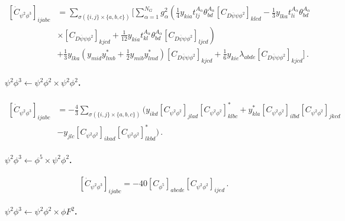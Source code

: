 \begin{align}
    \left[\dot C_{\psi^2\phi^3}\right]_{ijabc} &= \sum_{\sigma(\{i,j\}\times\{a,b,c\})}  \Bigg[\sum_{\alpha=1}^{N_G} g_\alpha^2 \left(\frac{1}{4} y_{kia} t_{lj}^{A_\alpha} \theta_{bd}^{A_\alpha} \left[C_{D\overline\psi\psi\phi^2}\right]_{klcd}-\frac{1}{3} y_{lka}t_{li}^{A_\alpha} \theta_{bd}^{A_\alpha} \right.\nonumber\\
    &\left.\times\left[C_{D\overline\psi\psi\phi^2}\right]_{kjcd}+ \frac{1}{12} y_{kia}t_{kl}^{A_\alpha} \theta_{bd}^{A_\alpha} \left[C_{D\overline\psi\psi\phi^2}\right]_{ljcd}\right) \\
    &+ \frac{1}{3} y_{lka}^{\phantom *} \left( y_{mid}^{\phantom *} y_{lmb}^* +\frac{1}{2}y_{mib}^{\phantom *} y_{lmd}^* \right)  \left[C_{D\overline\psi\psi\phi^2}\right]_{kjcd} +\frac{1}{6} y_{kie} \lambda_{abde} \left[C_{D\overline\psi\psi\phi^2}\right]_{kjcd}\Bigg]\,.\nonumber
\end{align}

\paragraph{\texorpdfstring{$\psi^2 \phi^3 \leftarrow \psi^2\phi^2\times\psi^2\phi^2$}{psi2phi3frompsi2phi2xpsi2phi2}.}

\begin{align}
    \left[\dot C_{\psi^2\phi^3}\right]_{ijabc} &= -\frac{4}{3} \sum_{\sigma(\{i,j\}\times\{a,b,c\})}
    \bigg(
    y_{ikd} \left[C_{\psi^2\phi^2}\right]_{jlad} \left[C_{\psi^2\phi^2}\right]_{klbc}^* + y_{kla}^* \left[C_{\psi^2\phi^2}\right]_{ilbd} \left[C_{\psi^2\phi^2}\right]_{jkcd}\nonumber \\
    &- 
    y_{jlc} \left[C_{\psi^2\phi^2}\right]_{ikad} \left[C_{\psi^2\phi^2}\right]_{lkbd}^*
    \bigg)\,.\label{psi2phi3_psi2phi2xpsi2phi2}
\end{align}

\paragraph{$\psi^2\phi^3 \leftarrow \phi^5 \times \psi^2\phi^2$.}

\begin{equation}
    \left[\dot C_{\psi^2\phi^3}\right]_{ijabc} = - 40 \left[C_{\phi^5}\right]_{abcde} \left[C_{\psi^2\phi^2}\right]_{ijed} \,.
\end{equation}

\paragraph{$\psi^2\phi^3 \leftarrow \psi^2\phi^2 \times \phi F^2$.}

